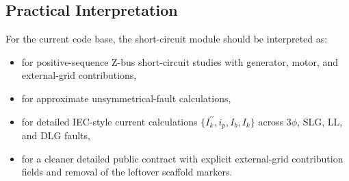 \subsection{Practical Interpretation}

For the current code base, the short-circuit module should be interpreted as:
\begin{itemize}
  \item \implemented{} for positive-sequence Z-bus short-circuit studies with generator, motor, and external-grid contributions,
  \item \implemented{} for approximate unsymmetrical-fault calculations,
  \item \implemented{} for detailed IEC-style current calculations \(\{I_{k}^{\prime\prime}, i_p, I_b, I_k\}\) across 3\(\phi\), SLG, LL, and DLG faults,
  \item \planned{} for a cleaner detailed public contract with explicit external-grid contribution fields and removal of the leftover scaffold markers.
\end{itemize}
